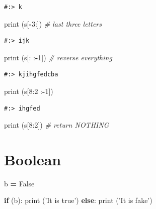 \documentclass[
]{book}
\newenvironment{Shaded}{\begin{snugshade}}{\end{snugshade}}
\newcommand{\BuiltInTok}[1]{#1}
\newcommand{\CommentTok}[1]{\textcolor[rgb]{0.37,0.37,0.37}{\textit{#1}}}
\newcommand{\ControlFlowTok}[1]{\textcolor[rgb]{0.27,0.27,0.27}{\textbf{#1}}}
\newcommand{\DecValTok}[1]{\textcolor[rgb]{0.06,0.06,0.06}{#1}}
\newcommand{\NormalTok}[1]{#1}
\newcommand{\OperatorTok}[1]{\textcolor[rgb]{0.43,0.43,0.43}{\textbf{#1}}}
\newcommand{\StringTok}[1]{\textcolor[rgb]{0.5,0.5,0.5}{#1}}
\newcommand{\VariableTok}[1]{\textcolor[rgb]{0,0,0}{#1}}
\begin{document}
\begin{verbatim}
#:> k
\end{verbatim}

\begin{Shaded}
\begin{Highlighting}[]
\BuiltInTok{print}\NormalTok{ (s[}\OperatorTok{-}\DecValTok{3}\NormalTok{:])     }\CommentTok{# last three letters}
\end{Highlighting}
\end{Shaded}

\begin{verbatim}
#:> ijk
\end{verbatim}

\begin{Shaded}
\begin{Highlighting}[]
\BuiltInTok{print}\NormalTok{ (s[:   :}\OperatorTok{-}\DecValTok{1}\NormalTok{]) }\CommentTok{# reverse everything}
\end{Highlighting}
\end{Shaded}

\begin{verbatim}
#:> kjihgfedcba
\end{verbatim}

\begin{Shaded}
\begin{Highlighting}[]
\BuiltInTok{print}\NormalTok{ (s[}\DecValTok{8}\NormalTok{:}\DecValTok{2}\NormalTok{ :}\OperatorTok{-}\DecValTok{1}\NormalTok{])}
\end{Highlighting}
\end{Shaded}

\begin{verbatim}
#:> ihgfed
\end{verbatim}

\begin{Shaded}
\begin{Highlighting}[]
\BuiltInTok{print}\NormalTok{ (s[}\DecValTok{8}\NormalTok{:}\DecValTok{2}\NormalTok{])     }\CommentTok{# return NOTHING}
\end{Highlighting}
\end{Shaded}

\hypertarget{boolean}{%
\section{Boolean}\label{boolean}}

\begin{Shaded}
\begin{Highlighting}[]
\NormalTok{b }\OperatorTok{=} \VariableTok{False}

\ControlFlowTok{if}\NormalTok{ (b):}
    \BuiltInTok{print}\NormalTok{ (}\StringTok{'It is true'}\NormalTok{)}
\ControlFlowTok{else}\NormalTok{:}
    \BuiltInTok{print}\NormalTok{ (}\StringTok{'It is fake'}\NormalTok{)}
\end{Highlighting}
\end{Shaded}
\end{document}
